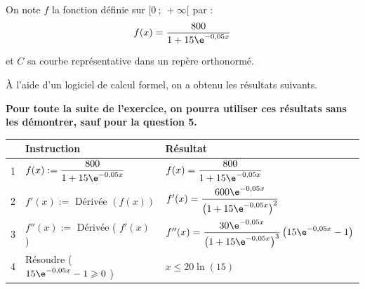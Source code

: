 	On note $f$ la fonction définie sur $[0 ~;~ +\infty[$ par :
	$$
	f(x)=\dfrac{800}{1+15 \e^{-0,05 x}}
	$$

	et $C$ sa courbe représentative dans un repère orthonormé.

	\medskip

	À l'aide d'un logiciel de calcul formel, on a obtenu les résultats suivants.

	\textbf{Pour toute la suite de l'exercice, on pourra utiliser ces résultats sans les démontrer, sauf pour la question 5.}

	\begin{center}
	\renewcommand{\arraystretch}{2.5}
\begin{tabularx}{\linewidth}{|l|l|>{\centering \arraybackslash}X|} 
\hline
  & Instruction & Résultat \\	
\hline
1 & $f(x):=\dfrac{800}{1+15 \e^{-0,05 x}}$	& $f(x)=\dfrac{800}{1+15 \e^{-0,05 x}}$  \\	
\hline
2 & $f'(x):=$ Dérivée $(f(x))$ & $f'(x)=\dfrac{600 \e^{-0,05 x}}{\left(1+15 \e^{-0,05 x}\right)^{2}}$ \\ 
\hline
3 & $f''(x):=$ Dérivée ( $f'(x)$ ) & $f''(x)=\dfrac{30 \e^{-0,05 x}}{\left(1+15 \e^{-0,05 x}\right)^{3}}\left(15 \e^{-0,05 x}-1\right)$ \\ 
\hline
4 & Résoudre ( $15 \e^{-0,05 x}-1 \geqslant 0$ )  & $x \leqslant 20 \ln (15)$  \\		
\hline
\end{tabularx}
\renewcommand{\arraystretch}{1}

	\end{center}

